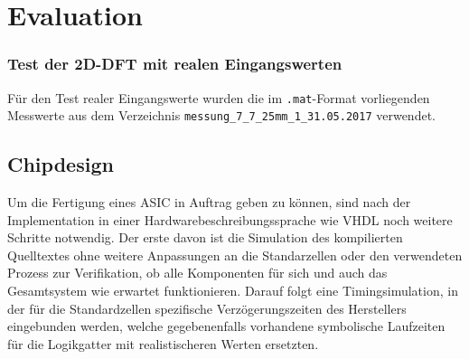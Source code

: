   
 
 
 






  
 \chapter{Evaluation}
 





 \subsection{Test der 2D-DFT mit realen Eingangswerten}
 
 Für den Test realer Eingangswerte wurden die im \texttt{.mat}-Format vorliegenden Messwerte aus dem Verzeichnis \texttt{messung\_7\_7\_25mm\_1\_31.05.2017} verwendet.
 
 
 
 \section{Chipdesign}
Um die Fertigung eines ASIC in Auftrag geben zu können, sind nach der Implementation in einer Hardwarebeschreibungssprache wie VHDL noch weitere Schritte notwendig.
Der erste davon ist die Simulation des kompilierten Quelltextes ohne weitere Anpassungen an die Standarzellen oder den verwendeten Prozess zur Verifikation, ob alle 
Komponenten für sich und auch das Gesamtsystem wie erwartet funktionieren.
Darauf folgt eine Timingsimulation, in der für die Standardzellen spezifische Verzögerungszeiten des Herstellers eingebunden werden, welche gegebenenfalls vorhandene 
symbolische Laufzeiten für die Logikgatter mit realistischeren Werten ersetzten.



 
